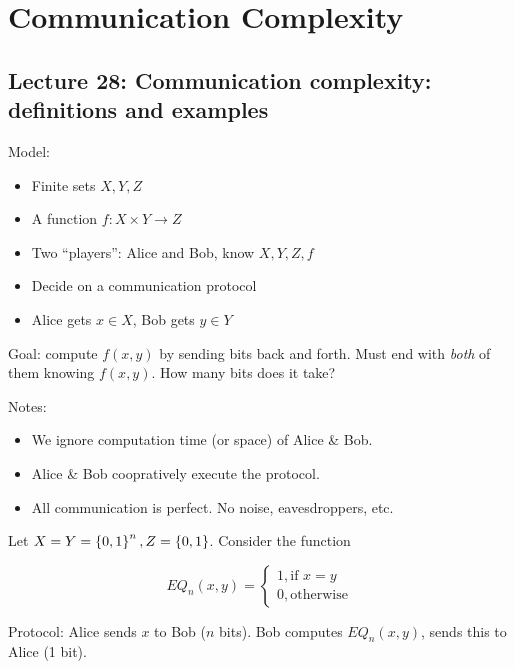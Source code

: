 \chapter{Communication Complexity}

\section*{Lecture 28: Communication complexity: definitions and examples}

Model:

\begin{itemize}
    \item Finite sets $X, Y, Z$
    \item A function $f: X \times Y \rightarrow Z$
    \item Two ``players'': Alice and Bob, know $X, Y, Z, f$
    \item Decide on a communication protocol
    \item Alice gets $x \in X$, Bob gets $y \in Y$
\end{itemize}

Goal: compute $f(x, y)$ by sending bits back and forth. Must end with \emph{both} of them knowing $f(x, y)$. How many bits does it take?

Notes:

\begin{itemize}
    \item We ignore computation time (or space) of Alice \& Bob.
    \item Alice \& Bob coopratively execute the protocol.
    \item All communication is perfect. No noise, eavesdroppers, etc.
\end{itemize}

\begin{example}
    Let $X = Y = \left \{ 0, 1 \right \}^n, Z = \left \{ 0, 1 \right \}$. Consider the function

    \begin{dmath*}
        EQ_n(x, y) =
        \begin{cases}
            1, \text{if } x = y\\
            0, \text{otherwise}
        \end{cases}
    \end{dmath*}
\end{example}

Protocol: Alice sends $x$ to Bob ($n$ bits). Bob computes $EQ_n(x, y)$, sends this to Alice (1 bit).

